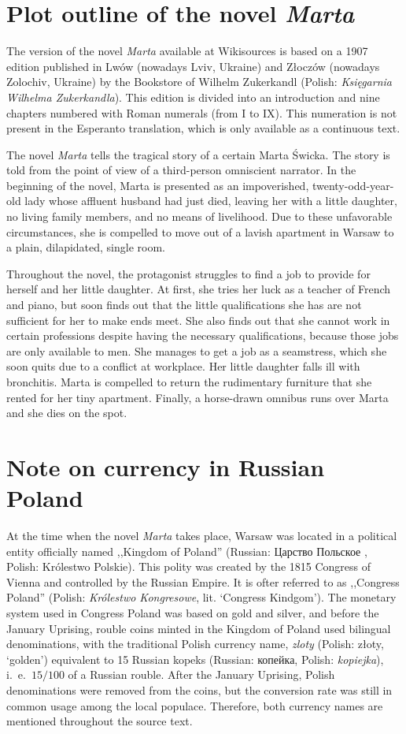 \section{Plot outline of the novel \textit{Marta}}
The version of the novel \textit{Marta} available at Wikisources is based on a 1907 edition published in Lwów (nowadays Lviv, Ukraine) and Złoczów (nowadays Zolochiv, Ukraine) by the Bookstore of Wilhelm Zukerkandl (Polish: \textit{Księgarnia Wilhelma Zukerkandla}).
This edition is divided into an introduction and nine chapters numbered with Roman numerals (from I to IX).
This numeration is not present in the Esperanto translation, which is only available as a continuous text.

The novel \textit{Marta} tells the tragical story of a certain Marta Świcka.
The story is told from the point of view of a third-person omniscient narrator.
In the beginning of the novel, Marta is presented as an impoverished, twenty-odd-year-old lady whose affluent husband had just died, leaving her with a little daughter, no living family members, and no means of livelihood.
Due to these unfavorable circumstances, she is compelled to move out of a lavish apartment in Warsaw to a plain, dilapidated, single room.

Throughout the novel, the protagonist struggles to find a job to provide for herself and her little daughter.
At first, she tries her luck as a teacher of French and piano, but soon finds out that the little qualifications she has are not sufficient for her to make ends meet.
She also finds out that she cannot work in certain professions despite having the necessary qualifications, because those jobs are only available to men.
She manages to get a job as a seamstress, which she soon quits due to a conflict at workplace.
Her little daughter falls ill with bronchitis.
Marta is compelled to return the rudimentary furniture that she rented for her tiny apartment.
Finally, a horse-drawn omnibus runs over Marta and she dies on the spot.

\section{Note on currency in Russian Poland}

At the time when the novel \textit{Marta} takes place, Warsaw was located in a political entity officially named ,,Kingdom of Poland'' (Russian: Царство Польское%
, Polish: Królestwo Polskie).
This polity was created by the 1815 Congress of Vienna and controlled by the Russian Empire.
It is ofter referred to as ,,Congress Poland'' (Polish: \textit{Królestwo Kongresowe}, lit. `Congress Kindgom').
The monetary system used in Congress Poland was based on gold and silver, and before the January Uprising, rouble coins minted in the Kingdom of Poland used bilingual denominations, with the traditional Polish currency name, \textit{zloty} (Polish: złoty, `golden') equivalent to 15 Russian kopeks (Russian: копейка, Polish: \textit{kopiejka}), i.\ e.\ $15/100$ of a Russian rouble.
After the January Uprising, Polish denominations were removed from the coins, but the conversion rate was still in common usage among the local populace.
Therefore, both currency names are mentioned throughout the source text.
